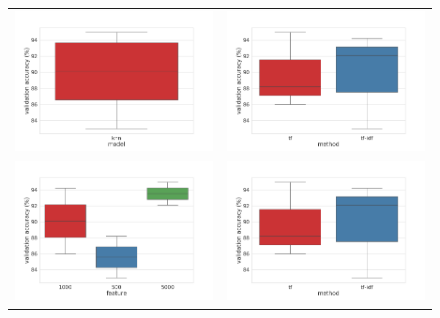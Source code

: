 \documentclass[a4paper,12pt,nottoc]{article}
\begin{document}
\begin{figure}[h]
\begin{center}
\begin{tabular}{c c}
\includegraphics[width=8cm]{output/model_performance.png} & \includegraphics[width=8cm]{output/method_performance.png} \\
\includegraphics[width=8cm]{output/feature_performance.png} & \includegraphics[width=8cm]{output/method_performance.png} \\

\end{tabular}
\end{center}
\end{figure}
\end{document}
